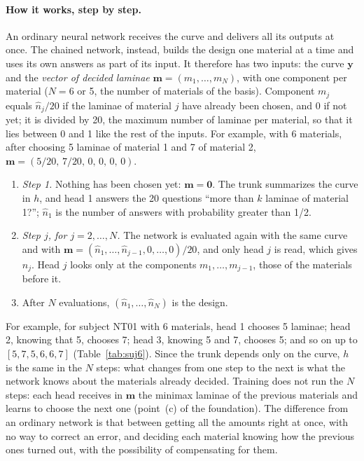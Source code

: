 \paragraph{How it works, step by step.} An ordinary neural network receives the curve and delivers all its outputs at once. The chained network, instead, builds the design one material at a time and uses its own answers as part of its input. It therefore has two inputs: the curve $\mathbf{y}$ and the \emph{vector of decided laminae} $\mathbf{m}=(m_1,\ldots,m_N)$, with one component per material ($N=6$ or 5, the number of materials of the basis). Component $m_j$ equals $\hat n_j/20$ if the laminae of material $j$ have already been chosen, and 0 if not yet; it is divided by 20, the maximum number of laminae per material, so that it lies between 0 and 1 like the rest of the inputs. For example, with 6 materials, after choosing 5 laminae of material 1 and 7 of material 2, $\mathbf{m}=(5/20,\,7/20,\,0,\,0,\,0,\,0)$.
\begin{enumerate}[label=(\arabic*)]
\item \emph{Step 1.} Nothing has been chosen yet: $\mathbf{m}=\mathbf{0}$. The trunk summarizes the curve in $h$, and head 1 answers the 20 questions ``more than $k$ laminae of material 1?''; $\hat n_1$ is the number of answers with probability greater than 1/2.
\item \emph{Step $j$, for $j=2,\ldots,N$.} The network is evaluated again with the same curve and with $\mathbf{m}=(\hat n_1,\ldots,\hat n_{j-1},0,\ldots,0)/20$, and only head $j$ is read, which gives $\hat n_j$. Head $j$ looks only at the components $m_1,\ldots,m_{j-1}$, those of the materials before it.
\item After $N$ evaluations, $(\hat n_1,\ldots,\hat n_N)$ is the design.
\end{enumerate}
For example, for subject NT01 with 6 materials, head 1 chooses 5 laminae; head 2, knowing that 5, chooses 7; head 3, knowing 5 and 7, chooses 5; and so on up to $[5,7,5,6,6,7]$ (Table~\ref{tab:suj6}). Since the trunk depends only on the curve, $h$ is the same in the $N$ steps: what changes from one step to the next is what the network knows about the materials already decided. Training does not run the $N$ steps: each head receives in $\mathbf{m}$ the minimax laminae of the previous materials and learns to choose the next one (point~(c) of the foundation). The difference from an ordinary network is that between getting all the amounts right at once, with no way to correct an error, and deciding each material knowing how the previous ones turned out, with the possibility of compensating for them.

